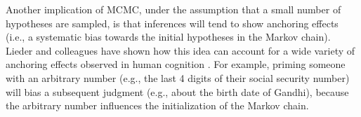 Another implication of MCMC, under the assumption that a small number of hypotheses are sampled, is that inferences will tend to show anchoring effects (i.e., a systematic bias towards the initial hypotheses in the Markov chain). Lieder and colleagues have shown how this idea can account for a wide variety of anchoring effects observed in human cognition \citep{lieder2012burn,lieder2017empirical}. For example, priming someone with an arbitrary number (e.g., the last 4 digits of their social security number) will bias a subsequent judgment (e.g., about the birth date of Gandhi), because the arbitrary number influences the initialization of the Markov chain.


\begin{figure}%
\begin{center}
\hfil
{} 

\hfil
{}


\end{center}
\end{figure}
